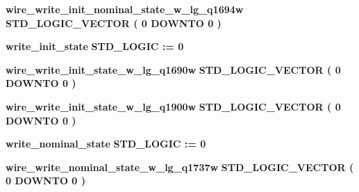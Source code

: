 \begin{DoxyCompactItemize}
\item 
{\bf wire\+\_\+write\+\_\+init\+\_\+nominal\+\_\+state\+\_\+w\+\_\+lg\+\_\+q1694w} {\bfseries \textcolor{comment}{S\+T\+D\+\_\+\+L\+O\+G\+I\+C\+\_\+\+V\+E\+C\+T\+OR}\textcolor{vhdlchar}{ }\textcolor{vhdlchar}{(}\textcolor{vhdlchar}{ }\textcolor{vhdlchar}{ } \textcolor{vhdldigit}{0} \textcolor{vhdlchar}{ }\textcolor{keywordflow}{D\+O\+W\+N\+TO}\textcolor{vhdlchar}{ }\textcolor{vhdlchar}{ } \textcolor{vhdldigit}{0} \textcolor{vhdlchar}{ }\textcolor{vhdlchar}{)}\textcolor{vhdlchar}{ }} 
\item 
{\bf write\+\_\+init\+\_\+state} {\bfseries \textcolor{comment}{S\+T\+D\+\_\+\+L\+O\+G\+IC}\textcolor{vhdlchar}{ }\textcolor{vhdlchar}{ }\textcolor{vhdlchar}{\+:}\textcolor{vhdlchar}{=}\textcolor{vhdlchar}{ }\textcolor{vhdlchar}{ }\textcolor{vhdlchar}{\textquotesingle{}}\textcolor{vhdlchar}{ } \textcolor{vhdldigit}{0} \textcolor{vhdlchar}{ }\textcolor{vhdlchar}{\textquotesingle{}}\textcolor{vhdlchar}{ }} 
\item 
{\bf wire\+\_\+write\+\_\+init\+\_\+state\+\_\+w\+\_\+lg\+\_\+q1690w} {\bfseries \textcolor{comment}{S\+T\+D\+\_\+\+L\+O\+G\+I\+C\+\_\+\+V\+E\+C\+T\+OR}\textcolor{vhdlchar}{ }\textcolor{vhdlchar}{(}\textcolor{vhdlchar}{ }\textcolor{vhdlchar}{ } \textcolor{vhdldigit}{0} \textcolor{vhdlchar}{ }\textcolor{keywordflow}{D\+O\+W\+N\+TO}\textcolor{vhdlchar}{ }\textcolor{vhdlchar}{ } \textcolor{vhdldigit}{0} \textcolor{vhdlchar}{ }\textcolor{vhdlchar}{)}\textcolor{vhdlchar}{ }} 
\item 
{\bf wire\+\_\+write\+\_\+init\+\_\+state\+\_\+w\+\_\+lg\+\_\+q1900w} {\bfseries \textcolor{comment}{S\+T\+D\+\_\+\+L\+O\+G\+I\+C\+\_\+\+V\+E\+C\+T\+OR}\textcolor{vhdlchar}{ }\textcolor{vhdlchar}{(}\textcolor{vhdlchar}{ }\textcolor{vhdlchar}{ } \textcolor{vhdldigit}{0} \textcolor{vhdlchar}{ }\textcolor{keywordflow}{D\+O\+W\+N\+TO}\textcolor{vhdlchar}{ }\textcolor{vhdlchar}{ } \textcolor{vhdldigit}{0} \textcolor{vhdlchar}{ }\textcolor{vhdlchar}{)}\textcolor{vhdlchar}{ }} 
\item 
{\bf write\+\_\+nominal\+\_\+state} {\bfseries \textcolor{comment}{S\+T\+D\+\_\+\+L\+O\+G\+IC}\textcolor{vhdlchar}{ }\textcolor{vhdlchar}{ }\textcolor{vhdlchar}{\+:}\textcolor{vhdlchar}{=}\textcolor{vhdlchar}{ }\textcolor{vhdlchar}{ }\textcolor{vhdlchar}{\textquotesingle{}}\textcolor{vhdlchar}{ } \textcolor{vhdldigit}{0} \textcolor{vhdlchar}{ }\textcolor{vhdlchar}{\textquotesingle{}}\textcolor{vhdlchar}{ }} 
\item 
{\bf wire\+\_\+write\+\_\+nominal\+\_\+state\+\_\+w\+\_\+lg\+\_\+q1737w} {\bfseries \textcolor{comment}{S\+T\+D\+\_\+\+L\+O\+G\+I\+C\+\_\+\+V\+E\+C\+T\+OR}\textcolor{vhdlchar}{ }\textcolor{vhdlchar}{(}\textcolor{vhdlchar}{ }\textcolor{vhdlchar}{ } \textcolor{vhdldigit}{0} \textcolor{vhdlchar}{ }\textcolor{keywordflow}{D\+O\+W\+N\+TO}\textcolor{vhdlchar}{ }\textcolor{vhdlchar}{ } \textcolor{vhdldigit}{0} \textcolor{vhdlchar}{ }\textcolor{vhdlchar}{)}\textcolor{vhdlchar}{ }} 

\end{DoxyCompactItemize}
